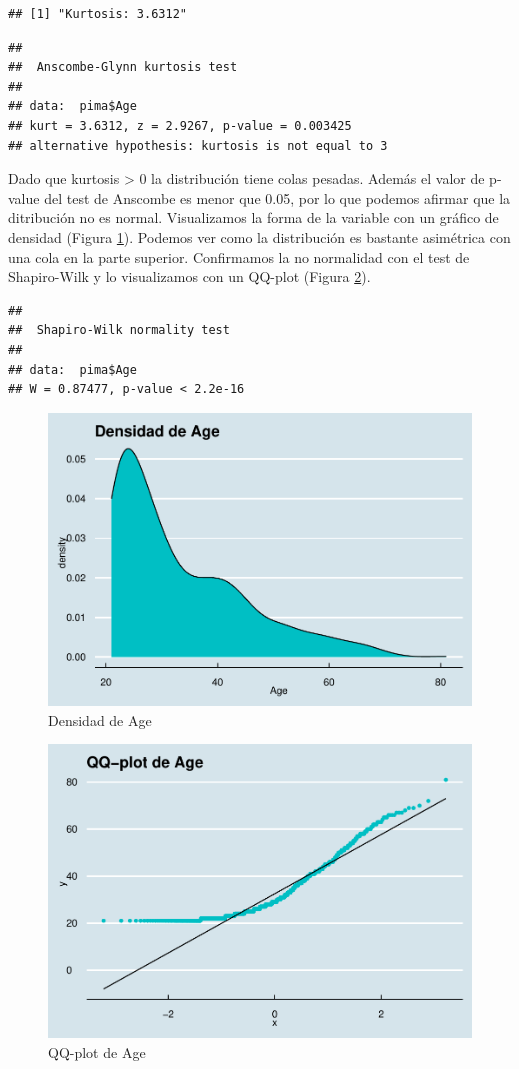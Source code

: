 \documentclass[
]{article}
\begin{document}
\begin{verbatim}
## [1] "Kurtosis: 3.6312"
\end{verbatim}

\begin{verbatim}
## 
##  Anscombe-Glynn kurtosis test
## 
## data:  pima$Age
## kurt = 3.6312, z = 2.9267, p-value = 0.003425
## alternative hypothesis: kurtosis is not equal to 3
\end{verbatim}

Dado que kurtosis \textgreater{} 0 la distribución tiene colas pesadas.
Además el valor de p-value del test de Anscombe es menor que 0.05, por
lo que podemos afirmar que la ditribución no es normal. Visualizamos la
forma de la variable con un gráfico de densidad (Figura
\ref{fig:dens_age}). Podemos ver como la distribución es bastante
asimétrica con una cola en la parte superior. Confirmamos la no
normalidad con el test de Shapiro-Wilk y lo visualizamos con un QQ-plot
(Figura \ref{fig:qq_age}).

\begin{verbatim}
## 
##  Shapiro-Wilk normality test
## 
## data:  pima$Age
## W = 0.87477, p-value < 2.2e-16
\end{verbatim}

\begin{figure}

{\centering \includegraphics[width=0.5\linewidth]{pima-clasificacion_files/figure-latex/dens_age-1} 

}

\caption{Densidad de Age}\label{fig:dens_age}
\end{figure}

\begin{figure}

{\centering \includegraphics[width=0.5\linewidth]{pima-clasificacion_files/figure-latex/qq_age-1} 

}

\caption{QQ-plot de Age}\label{fig:qq_age}
\end{figure}
\end{document}
